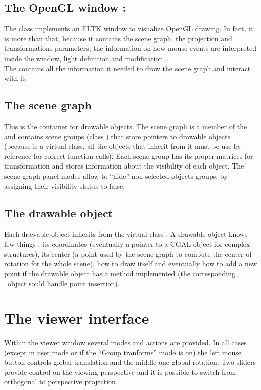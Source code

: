 \subsection{The OpenGL window : }

The class  implements an FLTK window to visualize OpenGL
drawing. In fact, it is more than that, because it contains
the scene graph, the projection and transformations parameters, the
information on how mouse events are interpreted inside the window,
light definition and modification...\\
The  contains all the information it needed to draw the
scene graph and interact with it.

\subsection{The scene graph}

This is the container for drawable objects. The scene graph is a
member of the  and contains
scene groups (class ) that store pointers to
drawable objects (because  is a virtual class,
all the objects that inherit from it must be use by reference for
correct function calls). Each scene group has its proper matrices for
transformation and stores information about the visibility of each
object. The scene graph panel modes allow to ``hide'' non selected
objects groups, by assigning their visibility status to false.

\subsection{The drawable object}

Each drawable object inherits from the virtual class 
. A drawable object knows few things : its coordinates 
(eventually a pointer to a CGAL object for complex structures), its
center (a point used by the scene graph to compute the center of
rotation for the whole scene), how to draw itself and eventually how to add a
new point if the drawable object has a  method
implemented (the corresponding \cgal\ object sould handle point
insertion).

\section{The viewer interface}

Within the viewer window several modes and actions are provided. In
all cases (except in user mode or if the ``Group tranforms'' mode is
on) the left mouse button controls global translation and the middle
one global rotation. Two sliders provide control on the viewing
perspective and it is possible to switch from orthogonal to 
perspective projection. 

